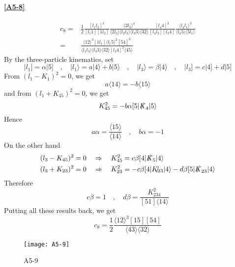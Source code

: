 \paragraph{\ref{A5-8}}
\begin{equation*}
\begin{split}
c_8 = & \frac{1}{2}
\frac{[l_1 l_2]^3}{[l_1 1][1l_2]}
\frac{\langle 2 l_2 \rangle^4}{\langle 2l_2 \rangle\langle l_2 l_3\rangle\langle l_3 3 \rangle\langle 32 \rangle}
\frac{[l_4 4 ]^3}{[l_4 l_3][l_3 4]}
\frac{\langle l_4 l_1 \rangle^3}{\langle l_4 5 \rangle\langle 5 l_1\rangle}
\\
= &
\frac{\langle 12 \rangle^3[1l_1 ]\langle l_1 5\rangle^2 [54]^3}{\langle l_1 l_3\rangle\langle l_3 3 \rangle\langle 32 \rangle [l_3 4 ]^2\langle 45\rangle}
\end{split}
\end{equation*}
By the three-particle kinematics, set
\begin{equation*}
|l_1] = \alpha |5]
\quad,\quad
|l_1\rangle = a|4\rangle + b|5\rangle
\quad,\quad
|l_3\rangle = \beta |4\rangle
\quad,\quad
|l_3] = c|4] + d|5]
\end{equation*}
From $(l_1 - K_1)^2 = 0$, we get
\begin{equation*}
a\langle 14\rangle = -b\langle 15 \rangle
\end{equation*}
and from $(l_1 + K_{45})^2 = 0$, we get
\begin{equation*}
K_{45}^2 = -b\alpha [5|\slashed{K}_4|5\rangle 
\end{equation*}
Hence
\begin{equation*}
a\alpha = \frac{\langle 15\rangle}{\langle 14\rangle}\quad,\quad
b\alpha = -1
\end{equation*}
On the other hand
\begin{equation*}
\begin{split}
& (l_3 - K_{45})^2 = 0 \quad\Rightarrow\quad
K_{45}^2 = c\beta [4|\slashed{K}_5|4\rangle
\\
& (l_3 + K_{23})^2 = 0 \quad\Rightarrow\quad
K_{23}^2 = -c\beta [4|\slashed{K_{23}}|4\rangle - d\beta [5|\slashed{K}_{23}|4\rangle
\end{split}
\end{equation*}
Therefore
\begin{equation*}
c\beta = 1 \quad,\quad 
d\beta = \frac{K_{234}^2}{[51]\langle 14 \rangle}
\end{equation*}
Putting all these results back, we get
\begin{equation*}
c_8 = \frac{1}{2}\frac{\langle 12 \rangle^3 [15] [54]}{\langle 43 \rangle\langle 32 \rangle}
\end{equation*}
%
%
\iffalse %
%
\begin{figure}
  \centering
    \texttt{[image: A5-9]}
    \caption{A5-9}
  \label{A5-9}
\end{figure}
